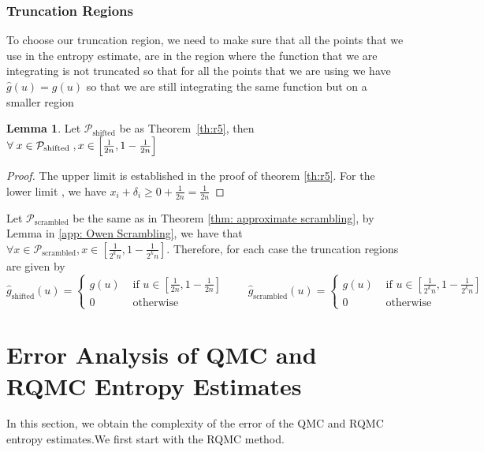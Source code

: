 \documentclass{article}
\theoremstyle{definition}
\newtheorem{lemma}[definition]{Lemma}
\begin{document}
\subsubsection{Truncation Regions}
\noindent To choose our truncation region, we need to make sure that all the points that we use in the entropy estimate, are in the region where the function that we are integrating is not truncated so that for all the points that we are using we have $\hat{g}(u)=g(u)$ so that we are still integrating the same function but on a smaller region 
\begin{lemma}
\label{lem:r3}
 Let $\mathcal{P}_{\text{shifted}}$ be as Theorem~\ref{th:r5}, then $\forall\;x\in\mathcal{P}_{\text{shifted}}\;, x \in\Bigl[\frac{1}{2n},1-\frac{1}{2n}\Bigr]$ 
 \end{lemma}
\begin{proof}
The upper limit is established in the proof of theorem \ref{th:r5}. For the lower limit , we have $x_i+\delta_i\geq 0 +\frac{1}{2n}=\frac{1}{2n}$
\end{proof}
\noindent Let $\mathcal{P}_{\text{scrambled}}$ be the same as in Theorem \ref{thm: approximate scrambling}, by Lemma \label{lem:r1} in \ref{app: Owen Scrambling}, we have that $\forall x\in\mathcal{P}_{\text{scrambled}},x\in\left[\frac{1}{2^k n},1-\frac{1}{2^k n}\right]$. Therefore, for each case the truncation regions are given by 
\begin{equation}
\label{eq:gghat}
\hat{g}_{\text{shifted}}(u)=\begin{cases} g(u) & \text{ if } u \in \left[\frac{1}{2n} , 1-\frac{1}{2n}\right]\\
0 & \text{ otherwise }
    \end{cases}\qquad 
\hat{g}_{\text{scrambled}}(u)=\begin{cases} g(u) & \text{ if } u \in \left[\frac{1}{2^{k}n} , 1-\frac{1}{2^{k}n}\right]\\
0 & \text{ otherwise }
    \end{cases}
\end{equation}

\section{Error Analysis of QMC and RQMC Entropy Estimates}
In this section, we obtain the complexity of the error of the QMC and RQMC entropy estimates.We first start with the RQMC method.
\end{document}
